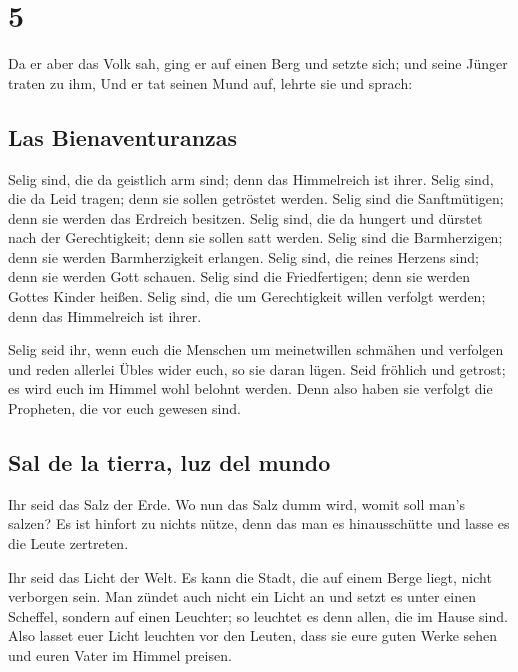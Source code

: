 \hypertarget{section-4}{%
\section{5}\label{section-4}}

 Da er aber das Volk sah, ging er auf einen Berg und
setzte sich; und seine Jünger traten zu ihm,  Und er tat
seinen Mund auf, lehrte sie und sprach:

\hypertarget{las-bienaventuranzas}{%
\subsection{Las Bienaventuranzas}\label{las-bienaventuranzas}}

 Selig sind, die da geistlich arm sind; denn das
Himmelreich ist ihrer.  Selig sind, die da Leid tragen;
denn sie sollen getröstet werden.  Selig sind die
Sanftmütigen; denn sie werden das Erdreich besitzen. 
Selig sind, die da hungert und dürstet nach der Gerechtigkeit; denn sie
sollen satt werden.  Selig sind die Barmherzigen; denn sie
werden Barmherzigkeit erlangen.  Selig sind, die reines
Herzens sind; denn sie werden Gott schauen.  Selig sind
die Friedfertigen; denn sie werden Gottes Kinder heißen. 
Selig sind, die um Gerechtigkeit willen verfolgt werden; denn das
Himmelreich ist ihrer.

 Selig seid ihr, wenn euch die Menschen um meinetwillen
schmähen und verfolgen und reden allerlei Übles wider euch, so sie daran
lügen.  Seid fröhlich und getrost; es wird euch im Himmel
wohl belohnt werden. Denn also haben sie verfolgt die Propheten, die vor
euch gewesen sind.

\hypertarget{sal-de-la-tierra-luz-del-mundo}{%
\subsection{Sal de la tierra, luz del
mundo}\label{sal-de-la-tierra-luz-del-mundo}}

 Ihr seid das Salz der Erde. Wo nun das Salz dumm wird,
womit soll man's salzen? Es ist hinfort zu nichts nütze, denn das man es
hinausschütte und lasse es die Leute zertreten.

 Ihr seid das Licht der Welt. Es kann die Stadt, die auf
einem Berge liegt, nicht verborgen sein.  Man zündet auch
nicht ein Licht an und setzt es unter einen Scheffel, sondern auf einen
Leuchter; so leuchtet es denn allen, die im Hause sind. 
Also lasset euer Licht leuchten vor den Leuten, dass sie eure guten
Werke sehen und euren Vater im Himmel preisen.

